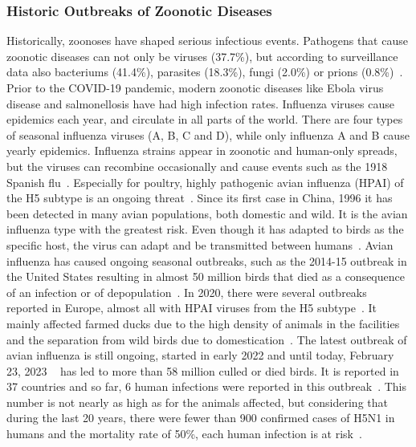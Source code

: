 \subsubsection*{Historic Outbreaks of Zoonotic Diseases}
Historically, zoonoses have shaped serious infectious events. Pathogens that cause zoonotic diseases can not only be viruses (37.7\%), but according to surveillance data also bacteriums (41.4\%), parasites (18.3\%), fungi (2.0\%) or prions (0.8\%)~\cite{salyer2017prioritizing}. Prior to the COVID-19 pandemic, modern zoonotic diseases like Ebola virus disease and salmonellosis have had high infection rates. Influenza viruses cause epidemics each year, and circulate in all parts of the world. There are four types of seasonal influenza viruses (A, B, C and D), while only influenza A and B cause yearly epidemics. Influenza strains appear in zoonotic and human-only spreads, but the viruses can recombine occasionally and cause events such as the 1918 Spanish flu~\cite{garten2009antigenic, gibbs2001recombination}. Especially for poultry, highly pathogenic avian influenza (HPAI) of the H5 subtype is an ongoing threat~\cite{lee2017evolution}. Since its first case in China, 1996 it has been detected in many avian populations, both domestic and wild. It is the avian influenza type with the greatest risk. Even though it has adapted to birds as the specific host, the virus can adapt and be transmitted between humans~\cite{webster1992evolution}. Avian influenza has caused ongoing seasonal outbreaks, such as the 2014-15 outbreak in the United States resulting in almost 50 million birds that died as a consequence of an infection or of depopulation~\cite{lee2016highly}. In 2020, there were several outbreaks reported in Europe, almost all with HPAI viruses from the H5 subtype~\cite{lewis2021emergence}. It mainly affected farmed ducks due to the high density of animals in the facilities and the separation from wild birds due to domestication~\cite{lewis2021emergence}. The latest outbreak of avian influenza is still ongoing, started in early 2022 and until today, February 23, 2023 ~ has led to more than 58 million culled or died birds. It is reported in 37 countries and so far, 6 human infections were reported in this outbreak~\cite{authority2023avian}. This number is not nearly as high as for the animals affected, but considering that during the last 20 years, there were fewer than 900 confirmed cases of H5N1 in humans and the mortality rate of 50\%, each human infection is at risk~\cite{authority2023avian}.

